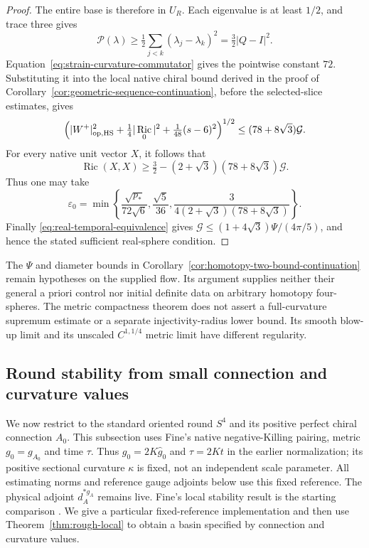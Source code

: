 \documentclass[11pt]{article}
\numberwithin{equation}{section}
\theoremstyle{definition}
\theoremstyle{remark}
\DeclareMathOperator{\Ric}{Ric}
\begin{document}
\begin{proof}
The entire base is therefore in \(U_R\). Each eigenvalue is
at least \(1/2\), and trace three gives
\[
 \mathcal P(\lambda)\ge\tfrac12\sum_{j<k}(\lambda_j-\lambda_k)^2
                 =\tfrac32|Q-I|^2.
\]
Equation~\eqref{eq:strain-curvature-commutator} gives the pointwise
constant \(72\). Substituting it into the local native chiral bound
derived in the proof of Corollary~\ref{cor:geometric-sequence-continuation},
before the selected-slice estimates, gives
\[
 \left(|W^+|_{\rm op,HS}^2+\tfrac14|\Ric_0|^2
                     +\tfrac1{48}(s-6)^2\right)^{1/2}
       \le (78+8\sqrt3)\mathcal G.
\]
For every native unit vector \(X\), it follows that
\[
 \Ric(X,X)\ge\tfrac32-(2+\sqrt3)(78+8\sqrt3)\mathcal G.
\]
Thus one may take
\[
 \varepsilon_0=\min\left\{\frac{\sqrt{p_*}}{72\sqrt6},
        \frac{\sqrt5}{36},
        \frac{3}{4(2+\sqrt3)(78+8\sqrt3)}\right\}.
\]
Finally \eqref{eq:real-temporal-equivalence} gives
\(\mathcal G\le(1+4\sqrt3)\Psi/(4\pi/5)\), and hence
the stated sufficient real-sphere condition.
\end{proof}


The \(\Psi\) and diameter bounds in
Corollary~\ref{cor:homotopy-two-bound-continuation} remain hypotheses
on the supplied flow. Its argument
supplies neither their general a priori control nor initial definite
data on arbitrary homotopy four-spheres. The metric compactness theorem
does not assert a full-curvature supremum estimate or a separate
injectivity-radius lower bound. Its smooth blow-up limit and its
unscaled \(C^{1,1/4}\) metric limit have different regularity.



\subsection{Round stability from small connection and curvature values}
\label{subsec:round-stability}

We now restrict to the standard oriented round $S^4$ and its
positive perfect chiral connection $A_0$. This subsection uses
Fine's native negative-Killing pairing, metric $g_0=g_{A_0}$ and
time $\tau$. Thus $g_0=2K\widehat g_0$ and $\tau=2Kt$ in the
earlier normalization; its positive sectional curvature $\kappa$
is fixed, not an independent scale parameter.
All estimating norms and reference gauge adjoints below use this
fixed reference. The physical adjoint $d_A^{*g_A}$ remains live.
Fine's local stability result is the starting comparison
\cite[Section 4.3]{Fine2011}. We give a particular fixed-reference
implementation and then use Theorem~\ref{thm:rough-local} to
obtain a basin specified by connection and curvature values.
\end{document}
